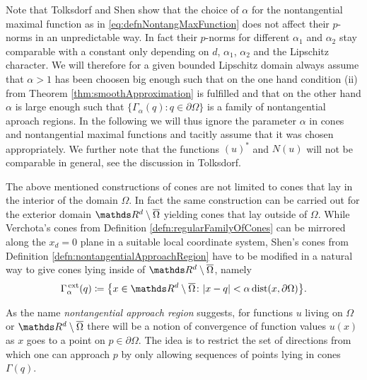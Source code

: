 Note that Tolksdorf \cite{tolksdorf} and Shen \cite{Shen2017} show that the choice of $\alpha$ for the nontangential maximal function as in \ref{eq:defnNontangMaxFunction} does not affect their $p$-norms in an unpredictable way. In fact their $p$-norms for different $\alpha_1$ and $\alpha_2$ stay comparable with a constant only depending on $d$, $\alpha_1$, $\alpha_2$ and the Lipschitz character.
We will therefore for a given bounded Lipschitz domain always assume that $\alpha > 1$ has been choosen big enough such that on the one hand condition (ii) from Theorem \ref{thm:smoothApproximation} is fulfilled and that on the other hand $\alpha$ is large enough such that $\{ \Gamma_\alpha(q) \colon q \in \partial\Omega \}$ is a family of nontangential aproach regions.
In the following we will thus ignore the parameter $\alpha$ in cones and nontangential maximal functions and tacitly assume that it was chosen appropriately.
We further note that the functions $(u)^*$ and $N(u)$ will not be comparable in general, see the discussion in Tolksdorf.

The above mentioned constructions of cones are not limited to cones that lay in the interior of the domain $\Omega$.
In fact the same construction can be carried out for the exterior domain $\R^d \setminus \overline{\Omega}$ yielding cones that lay outside of $\Omega$. While Verchota's cones from Definition \ref{defn:regularFamilyOfCones} can be mirrored along the $x_d = 0$ plane in a suitable local coordinate system, Shen's cones from Definition \ref{defn:nontangentialApproachRegion} have to be modified in a natural way to give cones lying inside of $\R^d \setminus \overline \Omega$, namely
\begin{align*}
  \Gamma_\alpha^{\,\mathrm{ext}}(q) \coloneqq \big\{ x \in \R^d \setminus \overline \Omega \colon |x - q| < \alpha \operatorname{dist}(x, \partial\Omega)\big\}.
\end{align*}

As the name \emph{nontangential approach region} suggests, for functions $u$ living on $\Omega$ or $\R^d \setminus \overline\Omega$ there will be a notion of convergence of function values $u(x)$ as $x$ goes to a point on $p \in \partial\Omega$.
The idea is to restrict the set of directions from which one can approach $p$ by only allowing sequences of points lying in cones $\Gamma(q)$.

